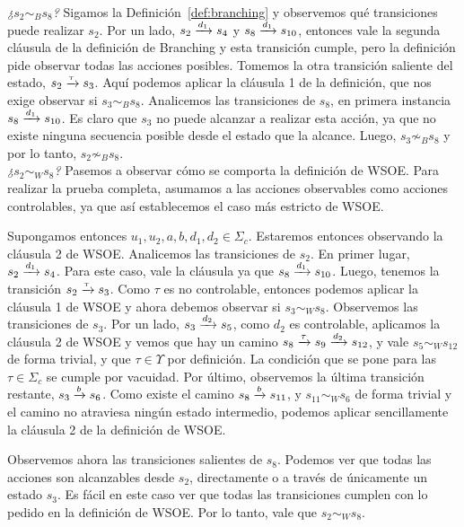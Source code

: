 \medskip
\noindent\emph{¿$s_2\sim_{B}s_8$?}
Sigamos la Definición~\ref{def:branching} y observemos qué transiciones puede realizar $s_2$. Por un lado, $s_2 \pijl{d_1} s_4$ y $s_8 \pijl{d_1} s_{10}$, entonces vale la segunda cláusula de la definición de Branching y esta transición cumple, pero la definición pide observar todas las acciones posibles. Tomemos la otra transición saliente del estado, $s_2 \pijl{\tau} s_3$. Aquí podemos aplicar la cláusula 1 de la definición, que nos exige observar si $s_3\sim_{B}s_8$. Analicemos las transiciones de $s_8$, en primera instancia $s_8 \pijl{d_1} s_{10}$. Es claro que $s_3$ no puede alcanzar a realizar esta acción, ya que no existe ninguna secuencia posible desde el estado que la alcance. Luego,  $s_3\not\sim_{B}s_8$ y por lo tanto, $s_2\not\sim_{B}s_8$. 
\\

\noindent\emph{¿$s_2\sim_{W}s_8$?} Pasemos a observar cómo se comporta la definición de WSOE. Para realizar la prueba completa, asumamos a las acciones observables como acciones controlables, ya que así establecemos el caso más estricto de WSOE.

Supongamos entonces $u_1,u_2,a,b,d_1,d_2\in\Sigma_c$. 
Estaremos entonces observando la cláusula 2 de WSOE. 
Analicemos las transiciones de $s_2$. 
En primer lugar, $s_2 \pijl{d_1} s_4$. 
Para este caso, vale la cláusula ya que $s_8 \pijl{d_1} s_{10}$. Luego, tenemos la transición $s_2 \pijl{\tau} s_3$. Como $\tau$ es no controlable, entonces podemos aplicar la cláusula 1 de WSOE y ahora debemos observar si $s_3\sim_{W}s_8$. Observemos las transiciones de $s_3$. Por un lado,  $s_3 \pijl{d_2} s_5$, como $d_2$ es controlable, aplicamos la cláusula 2 de WSOE y vemos que hay un camino $s_8 \pijl{\tau} s_9\pijl{d_2} s_{12}$, y vale $s_5\sim_{W}s_{12}$ de forma trivial, y que $\tau \in \Upsilon$ por definición. La condición que se pone para las $\tau \in\Sigma_c$ se cumple por vacuidad. Por último, observemos la última transición restante, $s_3 \pijl{b} s_6$. Como existe el camino $s_8 \pijl{b} s_{11}$, y $s_{11} \sim_{W} s_6$ de forma trivial y el camino no atraviesa ningún estado intermedio, podemos aplicar sencillamente la cláusula 2 de la definición de WSOE.

Observemos ahora las transiciones salientes de $s_8$. Podemos ver que todas las acciones son alcanzables desde $s_2$, directamente o a través de únicamente un estado $s_3$. Es fácil en este caso ver que todas las transiciones cumplen con lo pedido en la definición de WSOE.
Por lo tanto, vale que $s_2\sim_{W}s_8$.


